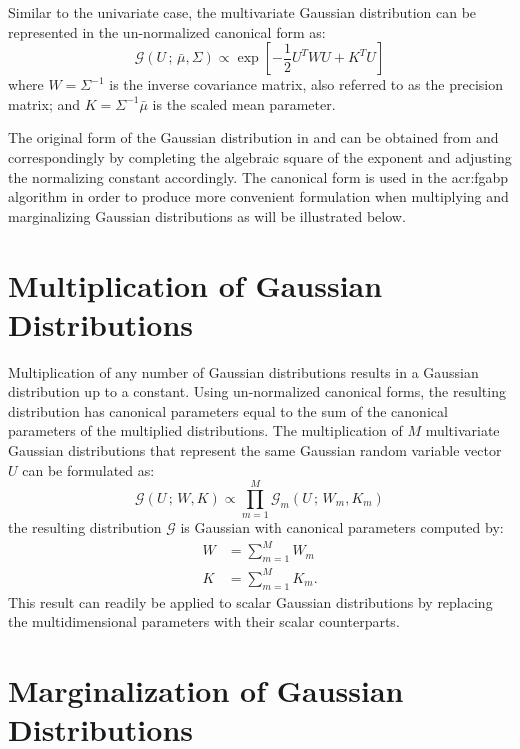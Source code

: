 Similar to the univariate case, the multivariate Gaussian distribution can be represented in the un-normalized canonical form as:
\begin{equation}
	\mathcal{G}(U\,;\,\bar{\mu},\Sigma) \propto \exp\left[-\frac{1}{2}U^T W U + K^T U \right]
	\label{eqn:gausDisMultCan}
\end{equation} 
where $W=\Sigma^{-1}$ is the inverse covariance matrix, also referred to as the precision matrix; and $K=\Sigma^{-1}\bar{\mu}$ is the scaled mean parameter.


The original form of the Gaussian distribution in  and  can be obtained from  and  correspondingly by completing the algebraic square of the exponent and adjusting the normalizing constant accordingly.
The canonical form is used in the \gls{acr:fgabp} algorithm in order to produce more convenient formulation when multiplying and marginalizing Gaussian distributions as will be illustrated below.


\section{Multiplication of Gaussian Distributions}

Multiplication of any number of Gaussian distributions results in a Gaussian distribution up to a constant.
Using un-normalized canonical forms, the resulting distribution has canonical parameters equal to the sum of the canonical parameters of the multiplied distributions.
The multiplication of $M$ multivariate Gaussian distributions that represent the same Gaussian random variable vector $U$ can be formulated as:
\begin{equation}
	\mathcal{G}(U\,;\,W,K) \propto \prod_{m=1}^{M} \mathcal{G}_m(U\,;\,W_m,K_m)
	\label{eqn:gausDisMultp}
\end{equation}
the resulting distribution $\mathcal{G}$ is Gaussian with canonical parameters computed by:
\begin{align}
	W &= \sum_{m=1}^{M} W_m \\
	K &= \sum_{m=1}^{M} K_m.
\end{align}
This result can readily be applied to scalar Gaussian distributions by replacing the multidimensional parameters with their scalar counterparts.


\section{Marginalization of Gaussian Distributions}

